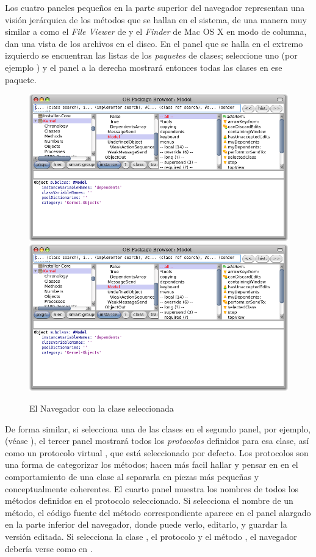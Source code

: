 \documentclass[spanish,a4paper,10pt,twoside]{book}
\begin{document}
Los cuatro paneles peque\~nos en la parte superior del navegador representan una visi\'on jer\'arquica de los m\'etodos que se hallan en el sistema, de una manera muy similar a como el \textit{File Viewer} de  y el \textit{Finder} de Mac OS X en modo de columna, dan una vista de los archivos en el disco.
En el panel que se halla en el extremo izquierdo se encuentran las listas de los \emph{paquetes} de clases; seleccione uno (por ejemplo ) y el panel a la derecha mostrar\'a entonces todas las clases en ese paquete.

\begin{figure}[htbp]
   \centering
   \ifluluelse
	   {\includegraphics[width=\textwidth]{SystemBrowser1} }
	   {\includegraphics[width=.7\textwidth]{SystemBrowser1} }
   \caption{El Navegador con la clase  seleccionada
   }
\end{figure}

De forma similar, si selecciona una de las clases en el segundo panel, por ejemplo,  (v\'ease ), el tercer panel mostrar\'a todos los \emph{protocolos} definidos para esa clase, as\'i como un protocolo virtual , que est\'a seleccionado por defecto.
Los protocolos son una forma de categorizar los m\'etodos; hacen m\'as facil hallar y pensar en en el comportamiento de una clase al separarla en piezas m\'as peque\~nas y conceptualmente coherentes.
El cuarto panel muestra los nombres de todos los m\'etodos definidos en el protocolo seleccionado.
Si selecciona el nombre de un m\'etodo, el c\'odigo fuente del m\'etodo correspondiente aparece en el panel alargado en la parte inferior del navegador, donde puede verlo, editarlo, y guardar la versi\'on editada.
Si selecciona la clase , el protocolo  y el m\'etodo , el navegador deber\'ia verse como en .
\end{document}
